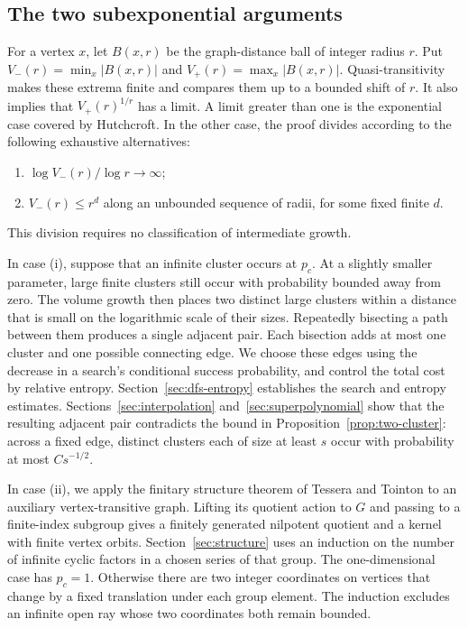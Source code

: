 \documentclass[11pt]{article}
\theoremstyle{definition}
\begin{document}
\subsection{The two subexponential arguments}

For a vertex $x$, let $B(x,r)$ be the graph-distance ball of integer
radius $r$. Put $V_-(r)=\min_x|B(x,r)|$ and
$V_+(r)=\max_x|B(x,r)|$. Quasi-transitivity makes these extrema finite
and compares them up to a bounded shift of $r$. It also implies that
$V_+(r)^{1/r}$ has a limit. A limit greater than one is the exponential
case covered by Hutchcroft. In the other case, the proof divides
according to the following exhaustive alternatives:
\begin{enumerate}[label=(\roman*)]
\item $\log V_-(r)/\log r\to\infty$;
\item $V_-(r)\le r^d$ along an unbounded sequence of radii, for some
fixed finite $d$.
\end{enumerate}
This division requires no classification of intermediate growth.

In case (i), suppose that an infinite cluster occurs at $p_c$.
At a slightly smaller parameter, large finite clusters still occur
with probability bounded away from zero. The volume growth then
places two distinct large clusters within a distance that is small
on the logarithmic scale of their sizes. Repeatedly bisecting a
path between them produces a single adjacent pair. Each bisection
adds at most one cluster and one possible connecting edge. We choose these
edges using the decrease in a search's conditional success
probability, and control the total cost by relative entropy.
Section~\ref{sec:dfs-entropy} establishes the search and entropy
estimates. Sections~\ref{sec:interpolation} and~\ref{sec:superpolynomial} show
that the resulting adjacent pair contradicts the bound in
Proposition~\ref{prop:two-cluster}: across a fixed edge, distinct
clusters each of size at least $s$ occur with probability at most
$Cs^{-1/2}$.

In case (ii), we apply the finitary structure theorem of Tessera and
Tointon \cite[Corollary~2.4]{TesseraTointon2021} to an auxiliary
vertex-transitive graph. Lifting its quotient action to $G$ and
passing to a finite-index subgroup gives a finitely generated
nilpotent quotient and a kernel with finite vertex orbits.
Section~\ref{sec:structure} uses an
induction on the number of infinite cyclic factors in a chosen
series of that group. The one-dimensional case has $p_c=1$.
Otherwise there are two integer coordinates on vertices that change
by a fixed translation under each group element. The induction excludes an infinite open ray whose
two coordinates both remain bounded.
\end{document}
